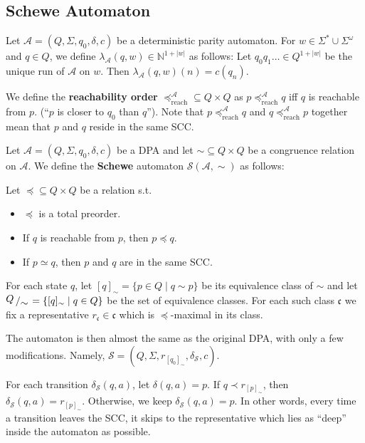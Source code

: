 

\subsection{Schewe Automaton}

\begin{defn}
	Let $\mathcal{A} = (Q, \Sigma, q_0, \delta, c)$ be a deterministic parity automaton. For $w \in \Sigma^* \cup \Sigma^\omega$ and $q \in Q$, we define $\lambda_\mathcal{A}(q, w) \in \mathbb{N}^{1+|w|}$ as follows: Let $q_0 q_1 \dots \in Q^{1+|w|}$ be the unique run of $\mathcal{A}$ on $w$. Then $\lambda_\mathcal{A}(q, w)(n) = c(q_n)$.
	
	We define the \textbf{reachability order} $\preceq_\text{reach}^\mathcal{A} \subseteq Q \times Q$ as $p \preceq_\text{reach}^\mathcal{A} q$ iff $q$ is reachable from $p$. (\enquote{$p$ is closer to $q_0$ than $q$}). Note that $p \preceq_\text{reach}^\mathcal{A} q$ and $q \preceq_\text{reach}^\mathcal{A} p$ together mean that $p$ and $q$ reside in the same SCC.
\end{defn}

\begin{defn}
	Let $\mathcal{A} = (Q, \Sigma, q_0, \delta, c)$ be a DPA and let $\sim \subseteq Q \times Q$ be a congruence relation on $\mathcal{A}$. We define the \textbf{Schewe} automaton $\mathcal{S}(\mathcal{A}, \sim)$ as follows:
	
	Let $\preceq \subseteq Q \times Q$ be a relation s.t.
	\begin{itemize}
		\item $\preceq$ is a total preorder.
		\item If $q$ is reachable from $p$, then $p \preceq q$.
		\item If $p \simeq q$, then $p$ and $q$ are in the same SCC.
	\end{itemize}
	
	For each state $q$, let $[q]_\sim = \{ p \in Q \mid q \sim p \}$ be its equivalence class of $\sim$ and let $\bigslant{Q}{\sim} = \{[q]_\sim \mid q \in Q\}$ be the set of equivalence classes. For each such class $\mathfrak{c}$ we fix a representative $r_\mathfrak{c} \in \mathfrak{c}$ which is $\preceq$-maximal in its class.
	
	The automaton is then almost the same as the original DPA, with only a few modifications. Namely, $\mathcal{S} = (Q, \Sigma, r_{[q_0]_\sim}, \delta_\mathcal{S}, c)$.
	
	For each transition $\delta_\mathcal{S}(q, a)$, let $\delta(q, a) = p$. If $q \prec r_{[p]_\sim}$, then $\delta_\mathcal{S}(q, a) = r_{[p]_\sim}$. Otherwise, we keep $\delta_\mathcal{S}(q, a) = p$. In other words, every time a transition leaves the SCC, it skips to the representative which lies as \enquote{deep} inside the automaton as possible.
\end{defn}

